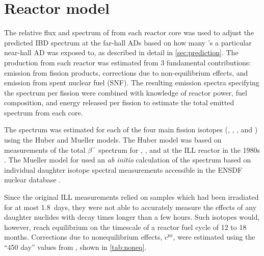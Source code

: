 \section{Reactor model}
\label{sec:reactor}

The relative flux and spectrum of \nuebar{} from each reactor core was used
to adjust the predicted IBD spectrum at the far-hall ADs
based on how many \nuebar{}'s a particular near-hall AD was exposed to,
as described in detail in \cref{sec:prediction}.
The \nuebar{} production from each reactor was estimated from 3 fundamental contributions:
emission from fission products, corrections due to non-equilibrium effects,
and emission from spent nuclear fuel (SNF).
The resulting emission spectra specifying the spectrum per fission
were combined with knowledge of reactor power, fuel composition,
and energy released per fission
to estimate the total emitted \nuebar{} spectrum from each core.

The \nuebar{} spectrum was estimated for each of the four main fission isotopes
(, , , and )
using the Huber \cite{reactor_huber} and Mueller \cite{reactor_mueller} models.
The Huber model was based on measurements of the total $\beta^{-}$ spectrum
for , , and 
at the ILL reactor in the 1980s
\cite{ill_1,ill_2,ill_3}.
The Mueller model for  used an \emph{ab initio} calculation
of the \nuebar{} spectrum
based on individual daughter isotope spectral measurements
accessible in the ENSDF nuclear database \cite{ensdf}.

Since the original ILL measurements relied on samples
which had been irradiated for at most 1.8~days,
they were not able to accurately measure
the effects of any daughter nuclides with decay times longer than a few hours.
Such isotopes would, however, reach equilibrium on the timescale
of a reactor fuel cycle of 12 to 18 months.
Corrections due to nonequilibrium effects, $c^{\text{ne}}$,
were estimated using the ``450 day'' values from \cite{reactor_mueller},
shown in \cref{tab:noneq}.

